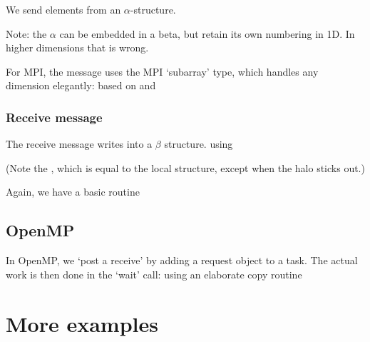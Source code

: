\documentclass[11pt,fleqn,preprint]{impreport}
\begin{document}
We send elements from an $\alpha$-structure.

\begin{remark}
  Note: the $\alpha$ can be embedded in a beta, but retain its own
  numbering in 1D. In higher dimensions that is wrong.
\end{remark}

For MPI, the message uses the MPI `subarray' type, which handles any
dimension elegantly:
%
%
%
based on
%
%
and
%

\subsubsection{Receive message}

The receive message writes into a $\beta$ structure.
%
%
using
%

(Note the , which is equal to the local structure,
except when the halo sticks out.)

Again, we have a basic routine
%

\subsection{OpenMP}

In OpenMP, we `post a receive' by adding a request object to a task.
%
%
The actual work is then done in the `wait' call:
%
%
using an elaborate copy routine
%

\section{More examples}

\end{document}
